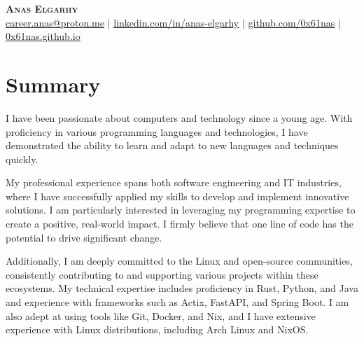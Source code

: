 \documentclass[letterpaper,11pt]{article}
\begin{document}

\begin{center}
    \textbf{\Huge \scshape Anas Elgarhy} \\ \vspace{1pt}
    \href{mailto:career.anas@proton.me}{\underline{career.anas@proton.me}} $|$
    \href{https://linkedin.com/in/anas-elgarhy}{\underline{linkedin.com/in/anas-elgarhy}} $|$
    \href{https://github.com/0x61nas}{\underline{github.com/0x61nas}} $|$
		\href{https://0x61nas.github.io}{\underline{0x61nas.github.io}}
\end{center}


\section{Summary}

I have been passionate about computers and technology since a young age. With proficiency in various programming languages and technologies, I have demonstrated the ability to learn and adapt to new languages and techniques quickly. \\ \vspace{4pt}

My professional experience spans both software engineering and IT industries, where I have successfully applied my skills to develop and implement innovative solutions. I am particularly interested in leveraging my programming expertise to create a positive, real-world impact. I firmly believe that one line of code has the potential to drive significant change. \\ \vspace{4pt}

Additionally, I am deeply committed to the Linux and open-source communities, consistently contributing to and supporting various projects within these ecosystems. My technical expertise includes proficiency in Rust, Python, and Java and experience with frameworks such as Actix, FastAPI, and Spring Boot. I am also adept at using tools like Git, Docker, and Nix, and I have extensive experience with Linux distributions, including Arch Linux and NixOS.  \\ \vspace{4pt}
\end{document}
